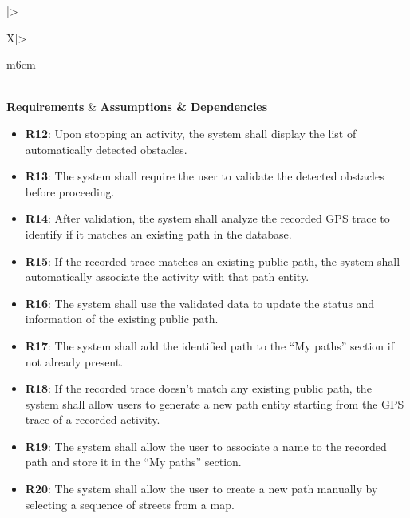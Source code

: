 \begin{table}[H]
    \centering
    \renewcommand{\arraystretch}{1.3}
    \begin{tabularx}{\textwidth}{|>{\raggedright\arraybackslash}X|>{\raggedright\arraybackslash}m{6cm}|}
        \hline
         \\ \hline
        \centering\textbf{Requirements} & \centering\textbf{Assumptions \& Dependencies} \tabularnewline \hline
        
        \begin{minipage}[t]{\linewidth}
        \begin{itemize}[leftmargin=*, nosep, label={}]
            \item \textbf{R12}: Upon stopping an activity, the system shall display the list of automatically detected obstacles.
            \item \textbf{R13}: The system shall require the user to validate the detected obstacles before proceeding.
            \item \textbf{R14}: After validation, the system shall analyze the recorded GPS trace to identify if it matches an existing path in the database.
            \item \textbf{R15}: If the recorded trace matches an existing public path, the system shall automatically associate the activity with that path entity.
            \item \textbf{R16}: The system shall use the validated data to update the status and information of the existing public path.
            \item \textbf{R17}: The system shall add the identified path to the “My paths” section if not already present.
            \item \textbf{R18}: If the recorded trace doesn't match any existing public path, the system shall allow users to generate a new path entity starting from the GPS trace of a recorded activity.
            \item \textbf{R19}: The system shall allow the user to associate a name to the recorded path and store it in the “My paths” section.
            \item \textbf{R20}: The system shall allow the user to create a new path manually by selecting a sequence of streets from a map.

\end{itemize}
\end{minipage}
\end{tabularx}
\end{table}
